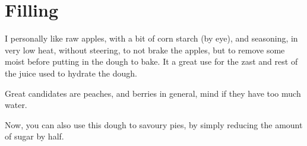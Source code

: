 \section{Filling}

I personally like raw apples, with a bit of corn starch (by eye), and seasoning, in very low heat, without steering, to not brake the apples, but to remove some moist before putting in the dough to bake.
%
It a great use for the zast and rest of the juice used to hydrate the dough.

Great candidates are peaches, and berries in general, mind if they have too much water.

Now, you can also use this dough to savoury pies, by simply reducing the amount of sugar by half.